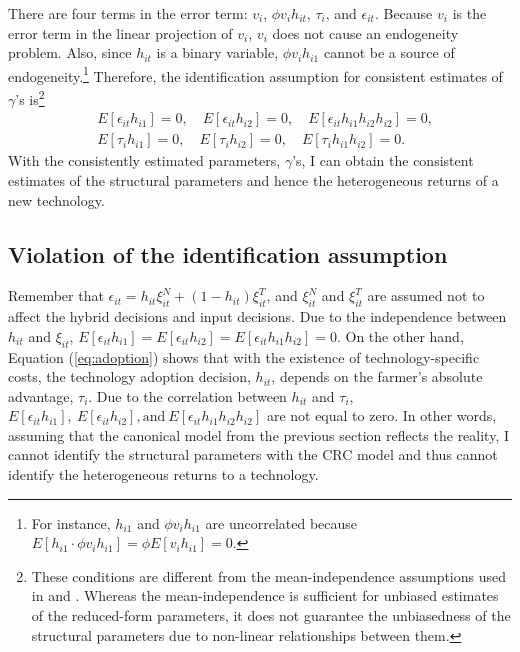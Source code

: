 \documentclass[11pt,letterpaper]{article}
\begin{document}
There are four terms in the error term: $v_i$, $\phi v_i h_{it}$, $\tau_i$, and $\epsilon_{it}$.
Because $v_i$ is the error term in the linear projection of $v_i$, $v_i$ does not cause an endogeneity problem.
Also, since $h_{it}$ is a binary variable, $\phi v_i h_{i1}$ cannot be a source of endogeneity.\footnote{
  For instance, $h_{i1}$ and $\phi v_i h_{i1}$ are uncorrelated because $E[h_{i1} \cdot \phi v_i h_{i1}] = \phi E[v_i h_{i1}] = 0$.
}
Therefore, the identification assumption for consistent estimates of $\gamma$'s is\footnote{
  These conditions are different from the mean-independence assumptions used in \citet{Suri11} and \citet{Michler2019}.
  Whereas the mean-independence is sufficient for unbiased estimates of the reduced-form parameters, it does not guarantee the unbiasedness of the structural parameters due to non-linear relationships between them.
}
\begin{align}
  &E[\epsilon_{it} h_{i1}] = 0, \quad E[\epsilon_{it} h_{i2}] = 0, \quad E[\epsilon_{it} h_{i1} h_{i2} h_{i2}] = 0, \label{eq:epsilon_h} \\
  &E[\tau_i h_{i1}] = 0, \quad E[\tau_i h_{i2}] = 0, \quad E[\tau_i h_{i1} h_{i2}] = 0. \label{eq:tau_h}
\end{align}
With the consistently estimated parameters, $\gamma$'s, I can obtain the consistent estimates of the structural parameters and hence the heterogeneous returns of a new technology.

\subsection{Violation of the identification assumption}

Remember that $\epsilon_{it} = h_{it} \xi_{it}^N + (1 - h_{it}) \xi_{it}^T$, and $\xi_{it}^N$ and $\xi_{it}^T$ are assumed not to affect the hybrid decisions and input decisions.
Due to the independence between $h_{it}$ and $\xi_{it}$, $E[\epsilon_{it} h_{i1}] = E[\epsilon_{it} h_{i2}] = E[\epsilon_{it} h_{i1} h_{i2}] = 0$.
On the other hand, Equation (\ref{eq:adoption}) shows that with the existence of technology-specific costs, the technology adoption decision, $h_{it}$, depends on the farmer's absolute advantage, $\tau_i$.
Due to the correlation between $h_{it}$ and $\tau_i$, $E[\epsilon_{it} h_{i1}], \ E[\epsilon_{it} h_{i2}], \text{and} \ E[\epsilon_{it} h_{i1} h_{i2} h_{i2}]$ are not equal to zero.
In other words, assuming that the canonical model from the previous section reflects the reality, I cannot identify the structural parameters with the CRC model and thus cannot identify the heterogeneous returns to a technology.
\end{document}
